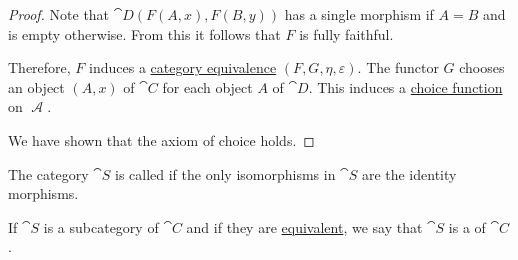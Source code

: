 \begin{proof}
  Note that \( \cat{D}(F(A, x), F(B, y)) \) has a single morphism if \( A = B \) and is empty otherwise. From this it follows that \( F \) is fully faithful.

  Therefore, \( F \) induces a \hyperref[def:category_equivalence]{category equivalence} \( (F, G, \eta, \varepsilon) \). The functor \( G \) chooses an object \( (A, x) \) of \( \cat{C} \) for each object \( A \) of \( \cat{D} \). This induces a \hyperref[def:choice_function]{choice function} on \( \mscrA \).

  We have shown that the axiom of choice holds.
\end{proof}

\begin{definition}\label{def:skeletal_category}
  The category \( \cat{S} \) is called  if the only isomorphisms in \( \cat{S} \) are the identity morphisms.

  If \( \cat{S} \) is a subcategory of \( \cat{C} \) and if they are \hyperref[def:category_equivalence]{equivalent}, we say that \( \cat{S} \) is a  of \( \cat{C} \).
\end{definition}

